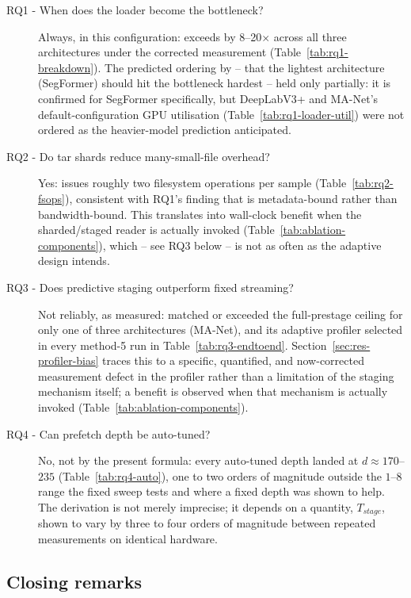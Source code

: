 \begin{description}
  \item[RQ1 - When does the loader become the bottleneck?]
    Always, in this configuration: \Tdata{} exceeds \Tgpu{} by 8--20$\times$
    across all three architectures under the corrected measurement
    (Table~\ref{tab:rq1-breakdown}). The predicted ordering by \Tgpu{} -- that
    the lightest architecture (SegFormer) should hit the bottleneck hardest --
    held only partially: it is confirmed for SegFormer specifically, but
    DeepLabV3+ and MA-Net's default-configuration GPU utilisation
    (Table~\ref{tab:rq1-loader-util}) were not ordered as the heavier-model
    prediction anticipated.
  \item[RQ2 - Do tar shards reduce many-small-file overhead?]
    Yes:  issues roughly two filesystem operations
    per sample (Table~\ref{tab:rq2-fsops}), consistent with RQ1's finding that
    \Tdata{} is metadata-bound rather than bandwidth-bound. This translates into
    wall-clock benefit when the sharded/staged reader is actually invoked
    (Table~\ref{tab:ablation-components}), which -- see RQ3 below -- is not as
    often as the adaptive design intends.
  \item[RQ3 - Does predictive staging outperform fixed streaming?]
    Not reliably, as measured: \pads{} matched or exceeded the full-prestage
    ceiling for only one of three architectures (MA-Net), and its adaptive
    profiler selected  in every method-5 run in
    Table~\ref{tab:rq3-endtoend}. Section~\ref{sec:res-profiler-bias} traces
    this to a specific, quantified, and now-corrected measurement defect in the
    profiler rather than a limitation of the staging mechanism itself; a benefit
    is observed when that mechanism is actually invoked
    (Table~\ref{tab:ablation-components}).
  \item[RQ4 - Can prefetch depth be auto-tuned?]
    No, not by the present formula: every auto-tuned depth landed at
    $d\approx170$--$235$ (Table~\ref{tab:rq4-auto}), one to two orders of
    magnitude outside the $1$--$8$ range the fixed sweep tests and where a fixed
    depth was shown to help. The derivation is not merely imprecise; it depends
    on a quantity, $T_{stage}$, shown to vary by three to four orders of
    magnitude between repeated measurements on identical hardware.
\end{description}

\subsection{Closing remarks}

